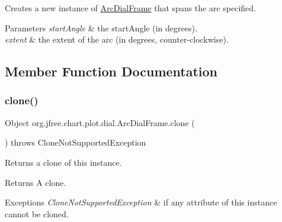 Creates a new instance of {\ttfamily \mbox{\hyperlink{classorg_1_1jfree_1_1chart_1_1plot_1_1dial_1_1_arc_dial_frame}{Arc\+Dial\+Frame}}} that spans the arc specified.


\begin{DoxyParams}{Parameters}
{\em start\+Angle} & the start\+Angle (in degrees). \\
\hline
{\em extent} & the extent of the arc (in degrees, counter-\/clockwise). \\
\hline
\end{DoxyParams}


\subsection{Member Function Documentation}
\mbox{\label{classorg_1_1jfree_1_1chart_1_1plot_1_1dial_1_1_arc_dial_frame_a4b74c7ce7132bf8f984d4a708237df41}} 
\subsubsection{\texorpdfstring{clone()}{clone()}}
{\footnotesize\ttfamily Object org.\+jfree.\+chart.\+plot.\+dial.\+Arc\+Dial\+Frame.\+clone (\begin{DoxyParamCaption}{ }\end{DoxyParamCaption}) throws Clone\+Not\+Supported\+Exception}

Returns a clone of this instance.

\begin{DoxyReturn}{Returns}
A clone.
\end{DoxyReturn}

\begin{DoxyExceptions}{Exceptions}
{\em Clone\+Not\+Supported\+Exception} & if any attribute of this instance cannot be cloned. \\
\hline
\end{DoxyExceptions}
\mbox{\label{classorg_1_1jfree_1_1chart_1_1plot_1_1dial_1_1_arc_dial_frame_a9ae1978aa11aa5274c2503e58e325d3c}} 
